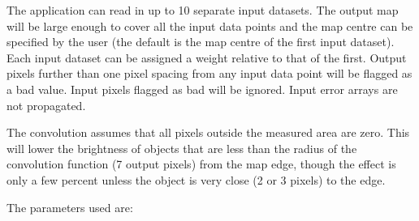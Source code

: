 The application can read in up to 10 separate input datasets. The
output map will be large enough to cover all the input data  points
and the map centre can be specified by the user (the  default is the
map centre of the first input dataset). Each input  dataset can be
assigned a weight relative to that of the first.  Output pixels
further than one pixel spacing from any input data  point will be
flagged as a bad value. Input pixels flagged as bad will be ignored.
Input error arrays are not propagated.

The convolution assumes that all pixels outside the measured  area are
zero. This will lower the brightness of objects that are  less than
the radius of the convolution function (7 output pixels)  from the map
edge, though the effect is only a few percent unless  the object is
very close (2 or 3 pixels) to the edge. 

\newpage    %

The parameters used are:

